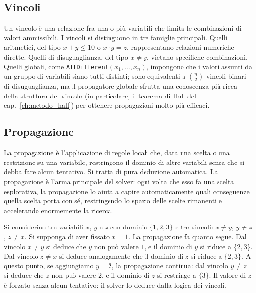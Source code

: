 \subsection{Vincoli}

Un vincolo \`e una relazione fra una o pi\`u variabili che
limita le combinazioni di valori ammissibili. I vincoli si
distinguono in tre famiglie principali. Quelli aritmetici,
del tipo $x + y \leq 10$ o $x \cdot y = z$, rappresentano
relazioni numeriche dirette. Quelli di disuguaglianza, del
tipo $x \neq y$, vietano specifiche combinazioni. Quelli
globali, come \texttt{AllDifferent}$(x_1, \ldots, x_n)$,
impongono che i valori assunti da un gruppo di variabili
siano tutti distinti; sono equivalenti a $\binom{n}{2}$
vincoli binari di disuguaglianza, ma il propagatore globale
sfrutta una conoscenza pi\`u ricca della struttura del
vincolo (in particolare, il teorema di Hall del
cap.~\ref{ch:metodo_hall}) per ottenere propagazioni molto
pi\`u efficaci.

\subsection{Propagazione}

La propagazione \`e l'applicazione di regole locali che,
data una scelta o una restrizione su una variabile,
restringono il dominio di altre variabili senza che si
debba fare alcun tentativo. Si tratta di pura deduzione
automatica. La propagazione \`e l'arma principale del solver:
ogni volta che esso fa una scelta esplorativa, la
propagazione lo aiuta a capire automaticamente quali
conseguenze quella scelta porta con s\'e, restringendo lo
spazio delle scelte rimanenti e accelerando enormemente la
ricerca.

\begin{esempiobox}
Si considerino tre variabili $x$, $y$ e $z$ con dominio
$\{1, 2, 3\}$ e tre vincoli: $x \neq y$, $y \neq z$,
$z \neq x$. Si supponga di aver fissato $x = 1$. La
propagazione fa quanto segue. Dal vincolo $x \neq y$ si
deduce che $y$ non pu\`o valere $1$, e il dominio di $y$ si
riduce a $\{2, 3\}$. Dal vincolo $z \neq x$ si deduce
analogamente che il dominio di $z$ si riduce a $\{2, 3\}$. A
questo punto, se aggiungiamo $y = 2$, la propagazione
continua: dal vincolo $y \neq z$ si deduce che $z$ non
pu\`o valere $2$, e il dominio di $z$ si restringe a
$\{3\}$. Il valore di $z$ \`e forzato senza alcun
tentativo: il solver lo deduce dalla logica dei vincoli.
\end{esempiobox}

